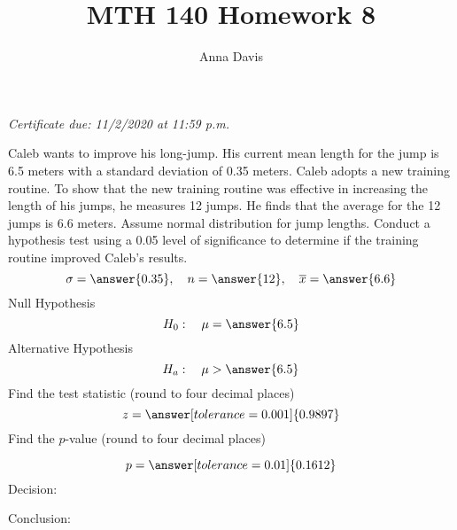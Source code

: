 \documentclass{ximera}
\author{Anna Davis} \title{MTH 140 Homework 8}
\begin{document}
\begin{abstract}

\end{abstract}
\maketitle
 \textit{Certificate due: 11/2/2020 at 11:59 p.m.}
 \begin{problem}\label{prob:140hom8prob4}
Caleb wants to improve his long-jump.  His current mean length for the jump is 6.5 meters with a standard deviation of 0.35 meters.  Caleb adopts a new training routine.  To show that the new training routine was effective in increasing the length of his jumps, he measures 12 jumps. He finds that the average for the 12 jumps is 6.6 meters.  Assume normal distribution for jump lengths.  Conduct a hypothesis test using a 0.05 level of significance to determine if the training routine improved Caleb's results.
$$\sigma=\answer{0.35},\quad n=\answer{12},\quad \overline{x}=\answer{6.6}$$
Null Hypothesis
$$H_0:\quad \mu=\answer{6.5}$$
Alternative Hypothesis
$$H_a:\quad \mu>\answer{6.5}$$
Find the test statistic (round to four decimal places)
$$z=\answer[tolerance=0.001]{0.9897}$$
Find the $p$-value (round to four decimal places)
\begin{center}  
\end{center}
$$p=\answer[tolerance=0.01]{0.1612}$$
Decision:

\begin{multipleChoice} 
\end{multipleChoice}  

Conclusion:

\begin{multipleChoice} 
\end{multipleChoice} 
\end{problem}
\end{document}
